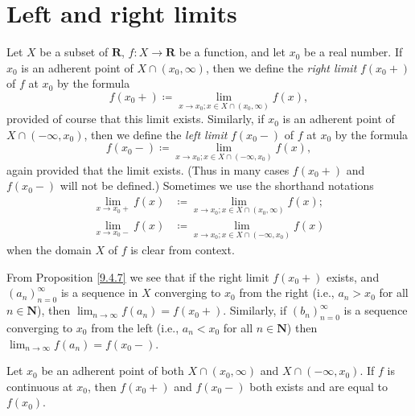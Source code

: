 \section{Left and right limits}\label{sec 9.5}

\begin{definition}\label{9.5.1}
    Let \(X\) be a subset of \(\mathbf{R}\), \(f : X \to \mathbf{R}\) be a function, and let \(x_0\) be a real number.
    If \(x_0\) is an adherent point of \(X \cap (x_0, \infty)\), then we define the \emph{right limit} \(f(x_0+)\) of \(f\) at \(x_0\) by the formula
    \[
        f(x_0+) \coloneqq \lim_{x \to x_0 ; x \in X \cap (x_0, \infty)} f(x),
    \]
    provided of course that this limit exists.
    Similarly, if \(x_0\) is an adherent point of \(X \cap (-\infty, x_0)\), then we define the \emph{left limit} \(f(x_0-)\) of \(f\) at \(x_0\) by the formula
    \[
        f(x_0-) \coloneqq \lim_{x \to x_0 ; x \in X \cap (-\infty, x_0)} f(x),
    \]
    again provided that the limit exists.
    (Thus in many cases \(f(x_0+)\) and \(f(x_0-)\) will not be defined.)
    Sometimes we use the shorthand notations
    \begin{align*}
        \lim_{x \to x_0+} f(x) & \coloneqq \lim_{x \to x_0 ; x \in X \cap (x_0, \infty)} f(x); \\
        \lim_{x \to x_0-} f(x) & \coloneqq \lim_{x \to x_0 ; x \in X \cap (-\infty, x_0)} f(x)
    \end{align*}
    when the domain \(X\) of \(f\) is clear from context.
\end{definition}

\begin{note}
    From Proposition \ref{9.4.7} we see that if the right limit \(f(x_0+)\) exists, and \((a_n)_{n = 0}^\infty\) is a sequence in \(X\) converging to \(x_0\) from the right (i.e., \(a_n > x_0\) for all \(n \in \mathbf{N}\)), then \(\lim_{n \to \infty} f(a_n) = f(x_0+)\).
    Similarly, if \((b_n)_{n = 0}^\infty\) is a sequence converging to \(x_0\) from the left (i.e., \(a_n < x_0\) for all \(n \in \mathbf{N}\)) then \(\lim_{n \to \infty} f(a_n) = f(x_0-)\).
\end{note}

\begin{additional corollary}\label{ac 9.5.1}
Let \(x_0\) be an adherent point of both \(X \cap (x_0, \infty)\) and \(X \cap (-\infty, x_0)\).
If \(f\) is continuous at \(x_0\), then \(f(x_0+)\) and \(f(x_0-)\) both exists and are equal to \(f(x_0)\).
\end{additional corollary}

